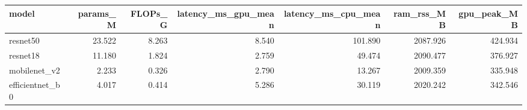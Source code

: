 \begin{tabular}{lrrrrrr}
\toprule
model & params_M & FLOPs_G & latency_ms_gpu_mean & latency_ms_cpu_mean & ram_rss_MB & gpu_peak_MB \\
\midrule
resnet50 & 23.522 & 8.263 & 8.540 & 101.890 & 2087.926 & 424.934 \\
resnet18 & 11.180 & 1.824 & 2.759 & 49.474 & 2090.477 & 376.927 \\
mobilenet_v2 & 2.233 & 0.326 & 2.790 & 13.267 & 2009.359 & 335.948 \\
efficientnet_b0 & 4.017 & 0.414 & 5.286 & 30.119 & 2020.242 & 342.546 \\
\bottomrule
\end{tabular}

